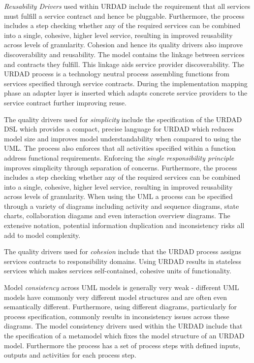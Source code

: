 \emph{Reusability Drivers} used within URDAD include the requirement that all services must fulfill a service contract and hence be pluggable. Furthermore, the process includes a step checking whether any of the required services can be combined into a single, cohesive, higher level service, resulting in improved reusability across levels of granularity. Cohesion and hence its quality drivers also improve discoverability and reusability. The model contains the linkage between services and contracts they fulfill. This linkage aids service provider discoverability. The URDAD process is a technology neutral process assembling functions from services specified through service contracts. During the implementation mapping phase an adapter layer is inserted which adapts concrete service providers to the service contract further improving reuse.

The quality drivers used for \emph{simplicity} include the specification of  the URDAD DSL which provides a compact, precise language for URDAD which reduces model size and improves model understandability when compared to using the UML. The process also enforces that all activities specified within a function address functional requirements. Enforcing the \emph{single responsibility principle} improves simplicity through separation of concerns. Furthermore, the process includes a step checking whether any of the required services can be combined into a single, cohesive, higher level service, resulting in improved reusability across levels of granularity. When using the UML a process can be specified through a variety of diagrams including activity and sequence diagrams, state charts, collaboration diagams and even interaction overview diagrams. The extensive notation, potential information duplication and inconsistency risks all add to model complexity.

The quality drivers used for \emph{cohesion} include that the URDAD process assigns services contracts to responsibility domains. Using URDAD results in stateless services which makes services self-contained, cohesive units of functionality.

Model \emph{consistency} across UML models is generally very weak - different UML models have commonly very different model structures and are often even semantically different. Furthermore, using different diagrams, particularly for process specification, commonly results in inconsistency issues across these diagrams. The model consistency drivers used within the URDAD include that the specification of a metamodel which fixes the model structure of an URDAD model. Furthermore the process has a set of process steps with defined inputs, outputs and activities for each process step.

